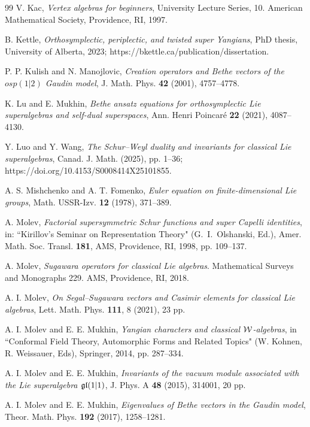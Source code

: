 \documentclass[12pt]{article}
\begin{document}
\begin{thebibliography}{99}
V. Kac,
{\it Vertex algebras for beginners},
University Lecture Series, 10. American Mathematical Society,
Providence, RI, 1997.

B. Kettle,
{\it Orthosymplectic, periplectic, and twisted
super Yangians}, PhD thesis, University of Alberta, 2023;
https://bkettle.ca/publication/dissertation.

P. P. Kulish and N. Manojlovic,
{\it Creation operators and Bethe vectors of the $osp(1|2)$
Gaudin model}, J. Math. Phys.
{\bf 42} (2001), 4757--4778.

K. Lu and E. Mukhin,
{\it Bethe ansatz equations for orthosymplectic Lie superalgebras
and self-dual superspaces},
Ann. Henri Poincar\'{e} {\bf 22} (2021), 4087--4130.

Y. Luo and Y. Wang,
{\it The Schur--Weyl duality and invariants for classical Lie superalgebras},
Canad. J. Math. (2025), pp. 1--36;
https://doi.org/10.4153/S0008414X25101855.

A. S. Mishchenko and A. T. Fomenko,
{\it Euler equation on finite-dimensional Lie groups},
Math. USSR-Izv. {\bf 12} (1978), 371--389.

{A. Molev},
{\it Factorial supersymmetric Schur functions
and super Capelli identities},
in: ``Kirillov's Seminar on Representation Theory"
(G.~I.~Olshanski, Ed.),
{Amer. Math. Soc. Transl.}
{\bf 181},
AMS, Providence, RI, 1998, pp. 109--137.

{A. Molev},
{\it Sugawara operators for classical Lie algebras}.
Mathematical Surveys and Monographs
229. AMS, Providence, RI, 2018.

A. I. Molev,
{\it On Segal--Sugawara vectors and Casimir elements for classical Lie algebras},
Lett. Math. Phys. {\bf 111}, 8 (2021), 23 pp.

A. I. Molev and E. E. Mukhin,
{\it Yangian characters and classical ${\mathcal W}$-algebras},
in ``Conformal Field Theory, Automorphic
Forms and Related Topics" (W. Kohnen, R. Weissauer, Eds),
Springer, 2014, pp. 287--334.

A. I. Molev and E. E. Mukhin,
{\it Invariants of the vacuum module associated with the Lie superalgebra $\mathfrak{gl}(1|1)$},
J. Phys. A {\bf 48} (2015), 314001, 20 pp.

A. I. Molev and E. E. Mukhin,
{\it Eigenvalues of Bethe vectors in the Gaudin model},
Theor. Math. Phys. {\bf 192} (2017), 1258--1281.


\end{thebibliography}
\end{document}
